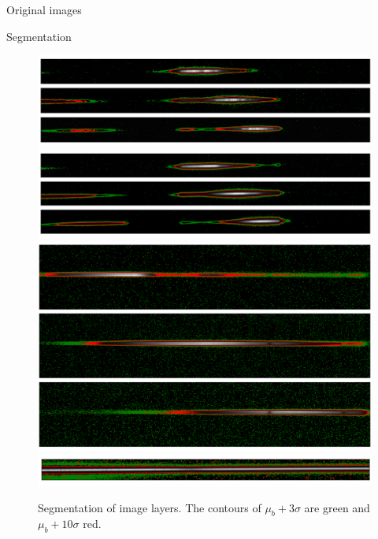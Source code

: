 \documentclass[final,t]{beamer}
\begin{document}
\begin{frame}
\begin{columns}[t]
\begin{column}{.32\linewidth}
\begin{block}{Original images}
				\end{block}
				
				\begin{block}{\space Segmentation}
					\begin{figure}
						\includegraphics[width=.8\columnwidth]{img/alpori_segm.png} \\
						\includegraphics[width=.8\columnwidth]{img/betori_segm.png} \\
						\includegraphics[width=.8\columnwidth]{img/alpcma_segm.png} \\
						\includegraphics[width=.8\columnwidth]{img/alpleo_segm.png}		
						\caption[segmentation]%
						{Segmentation of image layers.
							The contours of $\mu_b + 3 \sigma$ are green and $\mu_b + 10 \sigma$ red.}
						\label{fig:segmentation}
					\end{figure}
				\end{block}
			
			\end{column}

			

\end{columns}
\end{frame}
\end{document}
